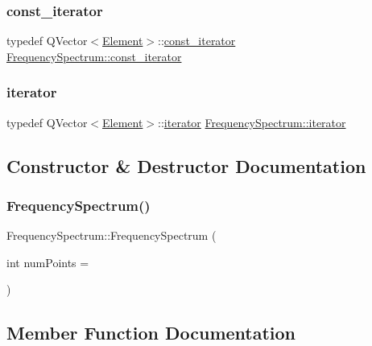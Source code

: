 \subsubsection{\texorpdfstring{const\+\_\+iterator}{const\_iterator}}
{\footnotesize\ttfamily typedef Q\+Vector$<$\hyperlink{struct_frequency_spectrum_1_1_element}{Element}$>$\+::\hyperlink{class_frequency_spectrum_a7dee82b74b040880feb5a0de2d7ab66b}{const\+\_\+iterator} \hyperlink{class_frequency_spectrum_a7dee82b74b040880feb5a0de2d7ab66b}{Frequency\+Spectrum\+::const\+\_\+iterator}}

\hypertarget{class_frequency_spectrum_a97c7fc372f25a6caef70041f07e4e1f3}{}\label{class_frequency_spectrum_a97c7fc372f25a6caef70041f07e4e1f3} 
\subsubsection{\texorpdfstring{iterator}{iterator}}
{\footnotesize\ttfamily typedef Q\+Vector$<$\hyperlink{struct_frequency_spectrum_1_1_element}{Element}$>$\+::\hyperlink{class_frequency_spectrum_a97c7fc372f25a6caef70041f07e4e1f3}{iterator} \hyperlink{class_frequency_spectrum_a97c7fc372f25a6caef70041f07e4e1f3}{Frequency\+Spectrum\+::iterator}}



\subsection{Constructor \& Destructor Documentation}
\hypertarget{class_frequency_spectrum_a6270014538a84e1edb5cecf6c3c918ee}{}\label{class_frequency_spectrum_a6270014538a84e1edb5cecf6c3c918ee} 
\subsubsection{\texorpdfstring{Frequency\+Spectrum()}{FrequencySpectrum()}}
{\footnotesize\ttfamily Frequency\+Spectrum\+::\+Frequency\+Spectrum (\begin{DoxyParamCaption}\item[{int}]{num\+Points = {} }\end{DoxyParamCaption})}



\subsection{Member Function Documentation}
\hypertarget{class_frequency_spectrum_a92aba05b6376874d54ced70d2e81309e}{}\label{class_frequency_spectrum_a92aba05b6376874d54ced70d2e81309e} 
